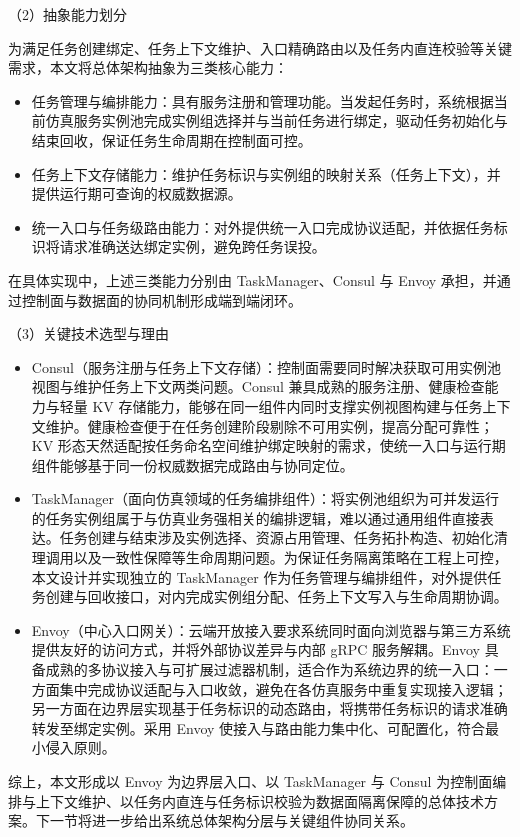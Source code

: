 \documentclass[lang=chs, degree=master, blindreview=true, winfonts=true, academic=false]{yanputhesis}
\begin{document}
（2）抽象能力划分

为满足任务创建绑定、任务上下文维护、入口精确路由以及任务内直连校验等关键需求，本文将总体架构抽象为三类核心能力：
\begin{itemize}
\item 任务管理与编排能力：具有服务注册和管理功能。当发起任务时，系统根据当前仿真服务实例池完成实例组选择并与当前任务进行绑定，驱动任务初始化与结束回收，保证任务生命周期在控制面可控。
\item 任务上下文存储能力：维护任务标识与实例组的映射关系（任务上下文），并提供运行期可查询的权威数据源。
\item 统一入口与任务级路由能力：对外提供统一入口完成协议适配，并依据任务标识将请求准确送达绑定实例，避免跨任务误投。
\end{itemize}

在具体实现中，上述三类能力分别由 TaskManager、Consul 与 Envoy 承担，并通过控制面与数据面的协同机制形成端到端闭环。

（3）关键技术选型与理由
\begin{itemize}
\item Consul（服务注册与任务上下文存储）：控制面需要同时解决获取可用实例池视图与维护任务上下文两类问题。Consul 兼具成熟的服务注册、健康检查能力与轻量 KV 存储能力，能够在同一组件内同时支撑实例视图构建与任务上下文维护。健康检查便于在任务创建阶段剔除不可用实例，提高分配可靠性；KV 形态天然适配按任务命名空间维护绑定映射的需求，使统一入口与运行期组件能够基于同一份权威数据完成路由与协同定位。
\item TaskManager（面向仿真领域的任务编排组件）：将实例池组织为可并发运行的任务实例组属于与仿真业务强相关的编排逻辑，难以通过通用组件直接表达。任务创建与结束涉及实例选择、资源占用管理、任务拓扑构造、初始化清理调用以及一致性保障等生命周期问题。为保证任务隔离策略在工程上可控，本文设计并实现独立的 TaskManager 作为任务管理与编排组件，对外提供任务创建与回收接口，对内完成实例组分配、任务上下文写入与生命周期协调。
\item Envoy（中心入口网关）：云端开放接入要求系统同时面向浏览器与第三方系统提供友好的访问方式，并将外部协议差异与内部 gRPC 服务解耦。Envoy 具备成熟的多协议接入与可扩展过滤器机制，适合作为系统边界的统一入口：一方面集中完成协议适配与入口收敛，避免在各仿真服务中重复实现接入逻辑；另一方面在边界层实现基于任务标识的动态路由，将携带任务标识的请求准确转发至绑定实例。采用 Envoy 使接入与路由能力集中化、可配置化，符合最小侵入原则。
\end{itemize}
综上，本文形成以 Envoy 为边界层入口、以 TaskManager 与 Consul 为控制面编排与上下文维护、以任务内直连与任务标识校验为数据面隔离保障的总体技术方案。下一节将进一步给出系统总体架构分层与关键组件协同关系。
\end{document}
